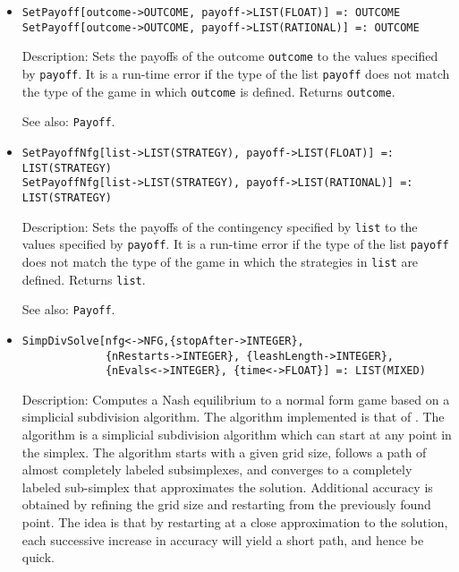 \begin{itemize}
\item
\protect \large \begin{verbatim}
SetPayoff[outcome->OUTCOME, payoff->LIST(FLOAT)] =: OUTCOME
SetPayoff[outcome->OUTCOME, payoff->LIST(RATIONAL)] =: OUTCOME
\end{verbatim}\normalsize

\bd
\item
[Description:] Sets the payoffs of the outcome \verb+outcome+ to the
values specified by \verb+payoff+.  It is a run-time error if the type
of the list \verb+payoff+ does not match the type of the game in which
\verb+outcome+ is defined.  Returns \verb+outcome+.
\item
[See also:] {\tt Payoff}.
\ed

\item
\protect \large \begin{verbatim}
SetPayoffNfg[list->LIST(STRATEGY), payoff->LIST(FLOAT)] =: LIST(STRATEGY)
SetPayoffNfg[list->LIST(STRATEGY), payoff->LIST(RATIONAL)] =: LIST(STRATEGY)
\end{verbatim}\normalsize

\bd
\item
[Description:] Sets the payoffs of the contingency specified by \verb+list+
to the values specified by \verb+payoff+.  It is a run-time error if
the type of the list \verb+payoff+ does not match the type of the game
in which the strategies in \verb+list+ are defined.  Returns \verb+list+.
\item
[See also:] {\tt Payoff}.  
\ed

\item
\protect \large \begin{verbatim}
SimpDivSolve[nfg<->NFG,{stopAfter->INTEGER}, 
             {nRestarts->INTEGER}, {leashLength->INTEGER},
             {nEvals<->INTEGER}, {time<->FLOAT}] =: LIST(MIXED)
\end{verbatim}\normalsize

\bd
\item
[Description:] Computes a Nash equilibrium to a normal form game based
on a simplicial subdivision algorithm.  The algorithm implemented is
that of \cite{VTH:1987}.  The 
algorithm is a simplicial subdivision algorithm which can start at any
point in the simplex.  The algorithm starts with a given grid size,
follows a path of almost completely labeled subsimplexes, and
converges to a completely labeled sub-simplex that approximates the
solution.  Additional accuracy is obtained by refining the grid size
and restarting from the previously found point.  The idea is that by
restarting at a close approximation to the solution, each successive
increase in accuracy will yield a short path, and hence be quick.


\end{itemize}
